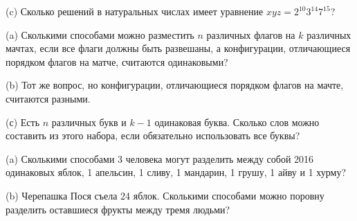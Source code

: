 \begin{problems}
(c) Сколько решений в натуральных числах имеет уравнение $xyz=2^{10}3^{14}7^{15}$?

\item 
(a) Сколькими способами можно разместить $n$ различных флагов на $k$ различных мачтах, если все флаги должны быть развешаны, а конфигурации, отличающиеся порядком флагов на матче, считаются одинаковыми?

(b) Тот же вопрос, но конфигурации, отличающиеся порядком флагов на мачте, считаются разными.

(с) Есть $n$ различных букв и $k-1$ одинаковая буква. Сколько слов можно составить из этого набора, если обязательно использовать все буквы?

\item (a) Сколькими способами 3 человека могут разделить между собой 2016 одинаковых яблок, 1 апельсин, 1 сливу, 1 мандарин, 1 грушу, 1 айву и 1 хурму?

(b) Черепашка Пося съела 24 яблок. Сколькими способами можно поровну разделить оставшиеся фрукты между тремя людьми?



\end{problems}
